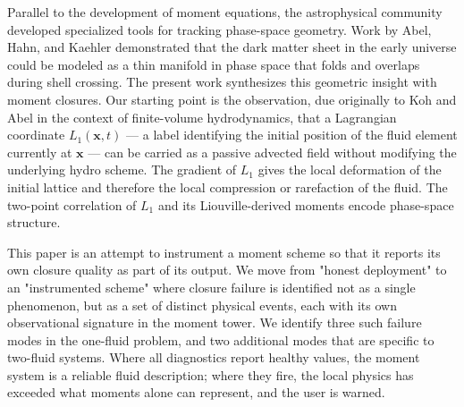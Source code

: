 \documentclass[11pt,letterpaper]{article}
\newcommand{\vecx}{\bm{x}}
\begin{document}
Parallel to the development of moment equations, the astrophysical community developed specialized tools for tracking phase-space geometry. Work by Abel, Hahn, and Kaehler \cite{Abel2012} demonstrated that the dark matter sheet in the early universe could be modeled as a thin manifold in phase space that folds and overlaps during shell crossing. The present work synthesizes this geometric insight with moment closures. Our starting point is the observation, due originally to Koh and Abel in the context of finite-volume hydrodynamics, that a Lagrangian coordinate $L_1(\vecx, t)$ --- a label identifying the initial position of the fluid element currently at $\vecx$ --- can be carried as a passive advected field without modifying the underlying hydro scheme. The gradient of $L_1$ gives the local deformation of the initial lattice and therefore the local compression or rarefaction of the fluid. The two-point correlation of $L_1$ and its Liouville-derived moments encode phase-space structure.

This paper is an attempt to instrument a moment scheme so that it reports its own closure quality as part of its output. We move from "honest deployment" to an "instrumented scheme" where closure failure is identified not as a single phenomenon, but as a set of distinct physical events, each with its own observational signature in the moment tower. We identify three such failure modes in the one-fluid problem, and two additional modes that are specific to two-fluid systems. Where all diagnostics report healthy values, the moment system is a reliable fluid description; where they fire, the local physics has exceeded what moments alone can represent, and the user is warned.
\end{document}
